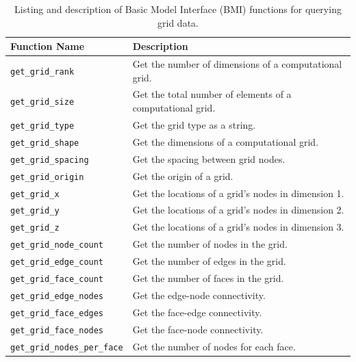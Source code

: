 \documentclass[journal abbreviation, manuscript]{copernicus}
\begin{document}
\begin{table}[htbp]
    \caption{Listing and description of Basic Model Interface (BMI) functions for querying grid data.}
    \begin{tabular}{ll}
        \hline
        Function Name &
        Description \\
        \hline\hline
        
        \verb|get_grid_rank| & Get the number of dimensions of a computational grid. \\
        \verb|get_grid_size| & Get the total number of elements of a computational grid. \\
        \verb|get_grid_type| & Get the grid type as a string. \\
        \verb|get_grid_shape| & Get the dimensions of a computational grid. \\
        \verb|get_grid_spacing| & Get the spacing between grid nodes. \\
        \verb|get_grid_origin| & Get the origin of a grid. \\
        \verb|get_grid_x| & Get the locations of a grid’s nodes in dimension 1. \\
        \verb|get_grid_y| & Get the locations of a grid’s nodes in dimension 2. \\
        \verb|get_grid_z| & Get the locations of a grid’s nodes in dimension 3. \\
        \verb|get_grid_node_count| & Get the number of nodes in the grid. \\
        \verb|get_grid_edge_count| & Get the number of edges in the grid. \\
        \verb|get_grid_face_count| & Get the number of faces in the grid. \\
        \verb|get_grid_edge_nodes| & Get the edge-node connectivity. \\
        \verb|get_grid_face_edges| & Get the face-edge connectivity. \\
        \verb|get_grid_face_nodes| & Get the face-node connectivity. \\
        \verb|get_grid_nodes_per_face| & Get the number of nodes for each face. \\
    \hline
   \end{tabular}
   \label{tab:bmi2}
\end{table}
\end{document}
